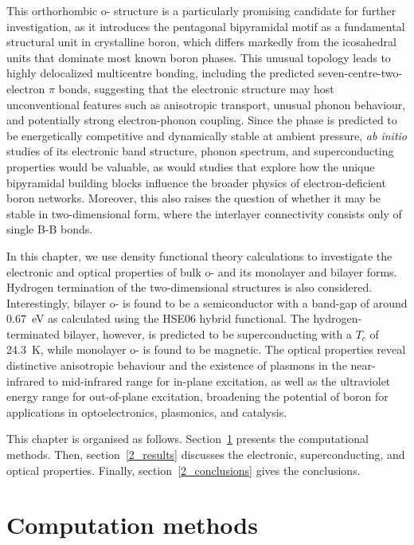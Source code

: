 This orthorhombic o- structure is a particularly promising candidate for further investigation,
as it introduces the pentagonal  bipyramidal motif as a fundamental structural unit in crystalline boron,
which differs markedly from the  icosahedral units that dominate most known boron phases.
This unusual topology leads to highly delocalized multicentre bonding,
including the predicted seven-centre-two-electron $\pi$ bonds,
suggesting that the electronic structure may host unconventional features such as anisotropic transport, unusual phonon behaviour,
and potentially strong electron-phonon coupling.
Since the phase is predicted to be energetically competitive and dynamically stable at ambient pressure, \textit{ab initio} studies of
its electronic band structure, phonon spectrum, and superconducting properties would be valuable,
as would studies that explore how the unique bipyramidal building blocks influence the broader physics of electron-deficient boron networks.
Moreover, this also raises the question of whether it may be stable in two-dimensional form,
where the interlayer connectivity consists only of single B-B bonds.

In this chapter, we use density functional theory calculations to investigate the electronic and optical properties of bulk o- and its monolayer and bilayer forms.
Hydrogen termination of the two-dimensional structures is also considered.
Interestingly, bilayer o- is found to be a semiconductor with a band-gap of around
\qty{0.67}{\electronvolt} as calculated using the HSE06 hybrid functional.
The hydrogen-terminated bilayer, however, is predicted to be superconducting with a $T_c$ of \qty{24.3}{K},
while monolayer o- is found to be magnetic.
The optical properties reveal distinctive anisotropic behaviour and the existence of plasmons in the near-infrared to mid-infrared range for in-plane excitation,
as well as the ultraviolet energy range for out-of-plane excitation,
broadening the potential of boron for applications in optoelectronics, plasmonics, and catalysis.

This chapter is organised as follows.
Section~\ref{2_methods} presents the computational methods.
Then, section~\ref{2_results} discusses the electronic, superconducting, and optical properties.
Finally, section~\ref{2_conclusions} gives the conclusions.

\section{Computation methods}
\label{2_methods}


